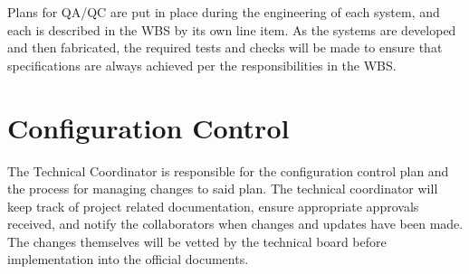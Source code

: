 Plans for QA/QC are put in place during the engineering of each system, and each is described in the WBS by its own line item.  As the systems are developed and then fabricated, the required tests and checks will be made to ensure that specifications are always achieved per the responsibilities in the WBS.








\section{Configuration Control}

The Technical Coordinator is responsible for the configuration control plan and the process for managing changes to said plan.  The technical coordinator will keep track of project related documentation, ensure appropriate approvals received, and notify the collaborators when changes and updates have been made.  The changes themselves will be vetted by the technical board before implementation into the official documents.  


